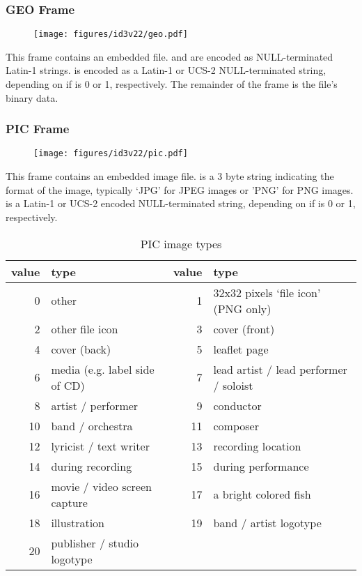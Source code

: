 \clearpage

\subsubsection{GEO Frame}
\begin{figure}[h]
\texttt{[image: figures/id3v22/geo.pdf]}
\end{figure}
This frame contains an embedded file.
 and  are encoded as NULL-terminated
Latin-1 strings.
 is encoded as a Latin-1 or UCS-2 NULL-terminated
string, depending on if  is 0 or 1, respectively.
The remainder of the frame is the file's binary data.

\subsubsection{PIC Frame}
\begin{figure}[h]
\texttt{[image: figures/id3v22/pic.pdf]}
\end{figure}
This frame contains an embedded image file.
 is a 3 byte string indicating the format of the image,
typically `JPG' for JPEG images or 'PNG' for PNG images.
 is a Latin-1 or UCS-2 encoded NULL-terminated string,
depending on if  is 0 or 1, respectively.

\begin{table}[h]
{
\begin{tabular}{|r|l||r|l|}
\hline
value & type & value & type \\
\hline
0 & other & 1 & 32x32 pixels `file icon' (PNG only) \\
2 & other file icon & 3 & cover (front) \\
4 & cover (back) & 5 & leaflet page \\
6 & media (e.g. label side of CD) & 7 & lead artist / lead performer / soloist \\
8 & artist / performer & 9 & conductor \\
10 & band / orchestra & 11 & composer \\
12 & lyricist / text writer & 13 & recording location \\
14 & during recording & 15 & during performance \\
16 & movie / video screen capture & 17 & a bright colored fish \\
18 & illustration & 19 & band / artist logotype \\
20 & publisher / studio logotype & &  \\
\hline
\end{tabular}
\caption{PIC image types}
}
\end{table}

